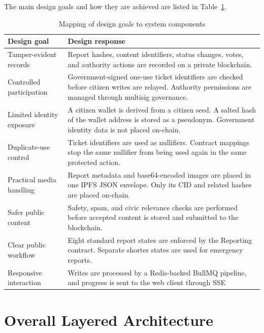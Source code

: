 The main design goals and how they are achieved are listed in Table~\ref{tab:requirements-mapping}.

\begin{table}[!htb]
    \centering
    \caption{Mapping of design goals to system components}
    \label{tab:requirements-mapping}
    \begin{tabular}{p{}|p{}}
        
        Design goal & Design response \\
        \hline
        Tamper-evident records & Report hashes, content identifiers, status changes, votes, and authority actions are recorded on a private blockchain. \\
        \hline
        Controlled participation & Government-signed one-use ticket identifiers are checked before citizen writes are relayed. Authority permissions are managed through multisig governance. \\
        \hline
        Limited identity exposure & A citizen wallet is derived from a citizen seed. A salted hash of the wallet address is stored as a pseudonym. Government identity data is not placed on-chain. \\
        \hline
        Duplicate-use control & Ticket identifiers are used as nullifiers. Contract mappings stop the same nullifier from being used again in the same protected action. \\
        \hline
        Practical media handling & Report metadata and base64-encoded images are placed in one \ac{IPFS} \ac{JSON} envelope. Only its \ac{CID} and related hashes are placed on-chain. \\
        \hline
        Safer public content & Safety, spam, and civic relevance checks are performed before accepted content is stored and submitted to the blockchain. \\
        \hline
        Clear public workflow & Eight standard report states are enforced by the Reporting contract. Separate shorter states are used for emergency reports. \\
        \hline
        Responsive interaction & Writes are processed by a Redis-backed BullMQ pipeline, and progress is sent to the web client through \ac{SSE}\\
       
    \end{tabular}
\end{table}

\section{Overall Layered Architecture}
\label{sec:layered-architecture}

